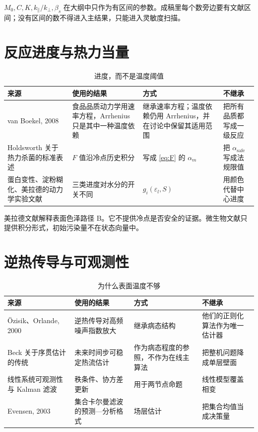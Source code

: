 $M_0,C,K,k_\parallel/k_\perp,\beta_s$ 在大纲中只作为有区间的参数。成稿里每个数旁边要有文献区间；没有区间的数不得进入主结果，只能进入灵敏度扫描。

\section{反应进度与热力当量}

\begin{table}[H]
\centering
\caption{进度，而不是温度阈值}
\begin{tabularx}{\textwidth}{lXll}
\toprule
来源 & 使用的结果 & 方式 & 不继承 \\
\midrule
van Boekel, 2008 & 食品品质动力学用速率方程，Arrhenius 只是其中一种温度依赖 & 继承速率方程；温度依赖仍用 Arrhenius，并在讨论中保留其适用范围 & 把所有品质都写成一级反应 \\
Holdsworth 关于热力杀菌的标准表述 & $F$ 值沿冷点历史积分 & 写成 \eqref{eq:F} 的 $\alpha_m$ & 把 $\alpha_{\mathrm{safe}}$ 写成法规限值 \\
蛋白变性、淀粉糊化、美拉德的动力学实验文献 & 三类进度对水分的开关不同 & $g_i(\varepsilon_l,S)$ & 用颜色代替中心进度 \\
\bottomrule
\end{tabularx}
\end{table}

美拉德文献解释表面色泽路径 B。它不提供冷点是否安全的证据。微生物文献只提供积分形式，初始污染量不在状态向量中。

\section{逆热传导与可观测性}

\begin{table}[H]
\centering
\caption{为什么表面温度不够}
\begin{tabularx}{\textwidth}{lXll}
\toprule
来源 & 使用的结果 & 方式 & 不继承 \\
\midrule
Özisik、Orlande, 2000 & 逆热传导对高频噪声指数放大 & 继承病态结构 & 他们的正则化算法作为唯一估计器 \\
Beck 关于序贯估计的传统 & 未来时间步可稳定热流估计 & 作为病态程度的参照，不作为在线主算法 & 把整机问题降成单层壁面 \\
线性系统可观测性与 Kalman 滤波 & 秩条件、协方差更新 & 用于两节点命题 & 线性模型覆盖相变 \\
Evensen, 2003 & 集合卡尔曼滤波的预测—分析格式 & 场层估计 & 把集合均值当成决策量 \\
\bottomrule
\end{tabularx}
\end{table}

